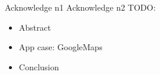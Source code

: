 \begin{acknowledgments}
	 Acknowledge n1
	\newline
	Acknowledge n2
	\newline
	\newline
	TODO: 
	\begin{itemize}
		\item Abstract
		\item App case: GoogleMaps
		\item Conclusion
	\end{itemize}
\end{acknowledgments}